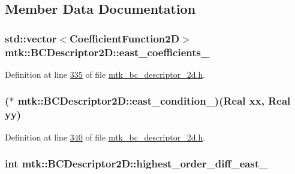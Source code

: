 \subsection{Member Data Documentation}
\hypertarget{classmtk_1_1BCDescriptor2D_a1f90fc303984bf18c136a34896bbb7c9}{
\subsubsection[{east\+\_\+coefficients\+\_\+}]{\setlength{\rightskip}{0pt plus 5cm}std\+::vector$<${\bf Coefficient\+Function2\+D}$>$ mtk\+::\+B\+C\+Descriptor2\+D\+::east\+\_\+coefficients\+\_\+\hspace{0.3cm}{\ttfamily [private]}}}\label{classmtk_1_1BCDescriptor2D_a1f90fc303984bf18c136a34896bbb7c9}


Definition at line \hyperlink{mtk__bc__descriptor__2d_8h_source_l00335}{335} of file \hyperlink{mtk__bc__descriptor__2d_8h_source}{mtk\+\_\+bc\+\_\+descriptor\+\_\+2d.\+h}.

\hypertarget{classmtk_1_1BCDescriptor2D_a6cca0c70293203c9d88773e5d5f93418}{
\subsubsection[{east\+\_\+condition\+\_\+}]{($\ast$ mtk\+::\+B\+C\+Descriptor2\+D\+::east\+\_\+condition\+\_\+)({\bf Real} xx, {\bf Real} yy)\hspace{0.3cm}{\ttfamily [private]}}}\label{classmtk_1_1BCDescriptor2D_a6cca0c70293203c9d88773e5d5f93418}


Definition at line \hyperlink{mtk__bc__descriptor__2d_8h_source_l00340}{340} of file \hyperlink{mtk__bc__descriptor__2d_8h_source}{mtk\+\_\+bc\+\_\+descriptor\+\_\+2d.\+h}.

\hypertarget{classmtk_1_1BCDescriptor2D_aea5e539a10d5641bd605ebe583c14bc5}{
\subsubsection[{highest\+\_\+order\+\_\+diff\+\_\+east\+\_\+}]{\setlength{\rightskip}{0pt plus 5cm}int mtk\+::\+B\+C\+Descriptor2\+D\+::highest\+\_\+order\+\_\+diff\+\_\+east\+\_\+\hspace{0.3cm}{\ttfamily [private]}}}\label{classmtk_1_1BCDescriptor2D_aea5e539a10d5641bd605ebe583c14bc5}


